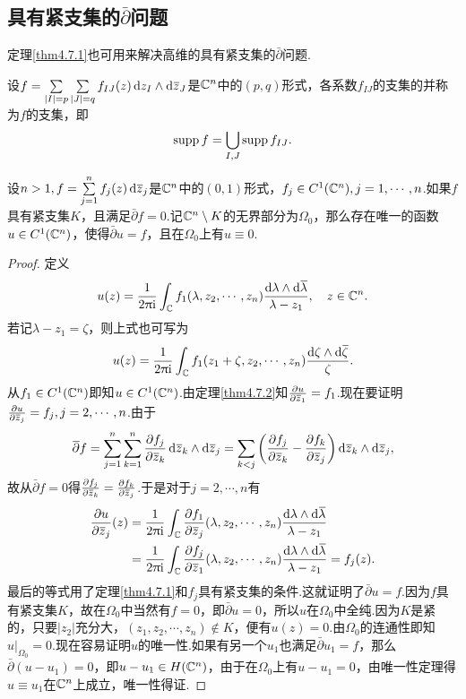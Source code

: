 \subsection{具有紧支集的$\bar{\partial}$问题}
定理\ref{thm4.7.1}也可用来解决高维的具有紧支集的$\bar{\partial}$问题.
\begin{definition}\label{def4.7.3}
	设$f=\sum\limits_{|I|=p}\sum\limits_{|J|=q}f_{IJ}(z)\dz_I\wedge\dzz_J$是$\MC^n$中的$(p,q)$形式，各系数$f_{IJ}$的支集的并称为$f$的支集，即
	\[\supp f=\bigcup_{I,J} \supp f_{IJ}.\]
\end{definition}
\begin{theorem}\label{thm4.7.4}
	设$n>1,f=\sum\limits_{j=1}^n f_j(z)\dzz_j$是$\MC^n$中的$(0,1)$形式，$f_j\in C^1(\MC^n),j=1,\cdots,n$.如果$f$具有紧支集$K$，且满足$\bar{\partial}f=0$.记$\MC^n\setminus K$的无界部分为$\Omega_0$，那么存在唯一的函数$u\in C^1(\MC^n)$，使得$\bar{\partial}u=f$，且在$\Omega_0$上有$u\equiv0$.
\end{theorem}
\begin{proof}
	定义
	\[u(z)=\frac1{2\pi\ii}\int_\MC f_1(\lambda,z_2,\cdots,z_n)\frac{\dif\lambda\wedge\dif\bar{\lambda}}{\lambda-z_1},\quad z\in\MC^n.\]
	若记$\lambda-z_1=\zeta$，则上式也可写为
	\[u(z)=\frac1{2\pi\ii}\int_\MC f_1(z_1+\zeta,z_2,\cdots,z_n)\frac{\dif\zeta\wedge\dif\bar{\zeta}}{\zeta}.\]
	从$f_1\in C^1(\MC^n)$即知$u\in C^1(\MC^n)$.由定理\ref{thm4.7.2}知$\pp{u}{\bar{z}_1}=f_1$.现在要证明$\pp{u}{\bar{z}_j}=f_j,j=2,\cdots,n$.由于
	\[\bar{\partial}f=\sum_{j=1}^{n}\sum_{k=1}^{n}\pp{f_j}{\bar{z}_k}\dif\bar{z}_k\wedge\dif\bar{z}_j=\sum_{k<j}\left(\pp{f_j}{\bar{z}_k}-\pp{f_k}{\bar{z}_j}\right)\dif\bar{z}_k\wedge\dif\bar{z}_j,\]
	故从$\bar{\partial}f=0$得$\pp{f_j}{\bar{z}_k}=\pp{f_k}{\bar{z}_j}$.于是对于$j=2,\cdots,n$有
	\begin{align*}
		\pp{u}{\bar{z}_j}(z)
		&=\frac1{2\pi\ii}\int_\MC \pp{f_1}{\bar{z}_j}(\lambda,z_2,\cdots,z_n)\frac{\dif\lambda\wedge\dif\bar{\lambda}}{\lambda-z_1}\\
		&=\frac1{2\pi\ii}\int_\MC \pp{f_j}{\bar{z}_1}(\lambda,z_2,\cdots,z_n)\frac{\dif\lambda\wedge\dif\bar{\lambda}}{\lambda-z_1}=f_j(z).
	\end{align*}
最后的等式用了定理\ref{thm4.7.1}和$f_j$具有紧支集的条件.这就证明了$\bar{\partial}u=f$.因为$f$具有紧支集$K$，故在$\Omega_0$中当然有$f=0$，即$\bar{\partial}u=0$，所以$u$在$\Omega_0$中全纯.因为$K$是紧的，只要$|z_2|$充分大，$(z_1,z_2,\cdots,z_n)\notin K$，便有$u(z)=0$.由$\Omega_0$的连通性即知$u|_{\Omega_0}=0$.现在容易证明$u$的唯一性.如果有另一个$u_1$也满足$\bar{\partial}u_1=f$，那么$\bar{\partial}(u-u_1)=0$，即$u-u_1\in H(\MC^n)$，由于在$\Omega_0$上有$u-u_1=0$，由唯一性定理得$u\equiv u_1$在$\MC^n$上成立，唯一性得证.
\end{proof}
